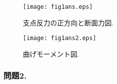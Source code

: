 ﻿\documentclass[10pt,a4j]{jarticle}
\begin{document}
\begin{figure}[h]
	\begin{center}
	\texttt{[image: fig1ans.eps]} 
	\end{center}
	\caption{支点反力の正方向と断面力図.}
	\label{fig:fig1}
\end{figure}
\begin{figure}[h]
	\begin{center}
	\texttt{[image: fig1ans2.eps]} 
	\end{center}
	\caption{曲げモーメント図.} 
	\label{fig:fig2}
\end{figure}
\subsubsection*{問題2.}
\end{document}
